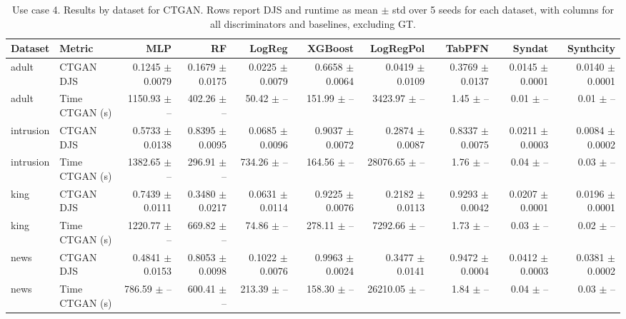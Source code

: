 \begin{table}[ht]
\centering
\small
\setlength{\tabcolsep}{3pt}
\caption{Use case 4. Results by dataset for CTGAN. Rows report DJS and runtime as mean $\pm$ std over 5 seeds for each dataset, with columns for all discriminators and baselines, excluding GT.}
\label{tab:uc4_ctgan_by_classifier_mean_std}
\begin{tabular}{llrrrrrrrr}
\toprule
Dataset & Metric & MLP & RF & LogReg & XGBoost & LogRegPol & TabPFN & Syndat & Synthcity \\
\midrule
adult & CTGAN DJS & 0.1245 $\pm$ 0.0079 & 0.1679 $\pm$ 0.0175 & 0.0225 $\pm$ 0.0079 & 0.6658 $\pm$ 0.0064 & 0.0419 $\pm$ 0.0109 & 0.3769 $\pm$ 0.0137 & 0.0145 $\pm$ 0.0001 & 0.0140 $\pm$ 0.0001 \\
adult & Time CTGAN (s) & 1150.93 $\pm$ -- & 402.26 $\pm$ -- & 50.42 $\pm$ -- & 151.99 $\pm$ -- & 3423.97 $\pm$ -- & 1.45 $\pm$ -- & 0.01 $\pm$ -- & 0.01 $\pm$ -- \\
intrusion & CTGAN DJS & 0.5733 $\pm$ 0.0138 & 0.8395 $\pm$ 0.0095 & 0.0685 $\pm$ 0.0096 & 0.9037 $\pm$ 0.0072 & 0.2874 $\pm$ 0.0087 & 0.8337 $\pm$ 0.0075 & 0.0211 $\pm$ 0.0003 & 0.0084 $\pm$ 0.0002 \\
intrusion & Time CTGAN (s) & 1382.65 $\pm$ -- & 296.91 $\pm$ -- & 734.26 $\pm$ -- & 164.56 $\pm$ -- & 28076.65 $\pm$ -- & 1.76 $\pm$ -- & 0.04 $\pm$ -- & 0.03 $\pm$ -- \\
king & CTGAN DJS & 0.7439 $\pm$ 0.0111 & 0.3480 $\pm$ 0.0217 & 0.0631 $\pm$ 0.0114 & 0.9225 $\pm$ 0.0076 & 0.2182 $\pm$ 0.0113 & 0.9293 $\pm$ 0.0042 & 0.0207 $\pm$ 0.0001 & 0.0196 $\pm$ 0.0001 \\
king & Time CTGAN (s) & 1220.77 $\pm$ -- & 669.82 $\pm$ -- & 74.86 $\pm$ -- & 278.11 $\pm$ -- & 7292.66 $\pm$ -- & 1.73 $\pm$ -- & 0.03 $\pm$ -- & 0.02 $\pm$ -- \\
news & CTGAN DJS & 0.4841 $\pm$ 0.0153 & 0.8053 $\pm$ 0.0098 & 0.1022 $\pm$ 0.0076 & 0.9963 $\pm$ 0.0024 & 0.3477 $\pm$ 0.0141 & 0.9472 $\pm$ 0.0004 & 0.0412 $\pm$ 0.0003 & 0.0381 $\pm$ 0.0002 \\
news & Time CTGAN (s) & 786.59 $\pm$ -- & 600.41 $\pm$ -- & 213.39 $\pm$ -- & 158.30 $\pm$ -- & 26210.05 $\pm$ -- & 1.84 $\pm$ -- & 0.04 $\pm$ -- & 0.03 $\pm$ -- \\
\bottomrule
\end{tabular}
\end{table}